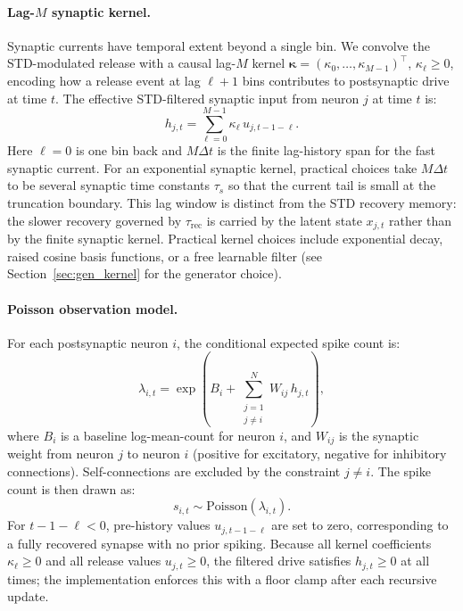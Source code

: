 \documentclass[11pt]{article}
\begin{document}
\paragraph{Lag-$M$ synaptic kernel.}
Synaptic currents have temporal extent beyond a single bin. We convolve the
STD-modulated release with a causal lag-$M$ kernel
$\bm{\kappa}=(\kappa_0,\dots,\kappa_{M-1})^\top$, $\kappa_\ell\geq 0$, encoding how
a release event at lag $\ell+1$ bins contributes to postsynaptic drive at time $t$.
The effective STD-filtered synaptic input from neuron $j$ at time $t$ is:
\begin{equation}
h_{j,t} = \sum_{\ell=0}^{M-1}\kappa_\ell\,u_{j,t-1-\ell}.
\label{eq:lag_kernel}
\end{equation}
Here $\ell=0$ is one bin back and $M\Delta t$ is the finite lag-history span for the fast synaptic current.
For an exponential synaptic kernel, practical choices take $M\Delta t$ to be
several synaptic time constants $\tau_s$ so that the current tail is small at
the truncation boundary. This lag window is distinct from the STD recovery
memory: the slower recovery governed by $\tau_{\mathrm{rec}}$ is carried by the
latent state $x_{j,t}$ rather than by the finite synaptic kernel. Practical
kernel choices include exponential decay, raised cosine basis functions, or a
free learnable filter (see Section~\ref{sec:gen_kernel} for the generator
choice).

\paragraph{Poisson observation model.}
For each postsynaptic neuron $i$, the conditional expected spike count is:
\begin{equation}
\lambda_{i,t}
=
\exp\!\left(
B_i
+
\sum_{\substack{j=1\\j\neq i}}^{N}
W_{ij}\,h_{j,t}
\right),
\label{eq:bernoulli_obs}
\end{equation}
where $B_i$ is a baseline log-mean-count for neuron $i$, and $W_{ij}$ is the synaptic weight from neuron $j$
to neuron $i$ (positive for excitatory, negative for inhibitory connections).
Self-connections are excluded by the constraint $j\neq i$.
The spike count is then drawn as:
\begin{equation}
s_{i,t} \sim \mathrm{Poisson}(\lambda_{i,t}).
\label{eq:bernoulli_likelihood}
\end{equation}
For $t-1-\ell<0$, pre-history values $u_{j,t-1-\ell}$ are set to zero, corresponding
to a fully recovered synapse with no prior spiking.
Because all kernel coefficients $\kappa_\ell\geq0$ and all release values
$u_{j,t}\geq0$, the filtered drive satisfies $h_{j,t}\geq0$ at all times;
the implementation enforces this with a floor clamp after each recursive update.
\end{document}
